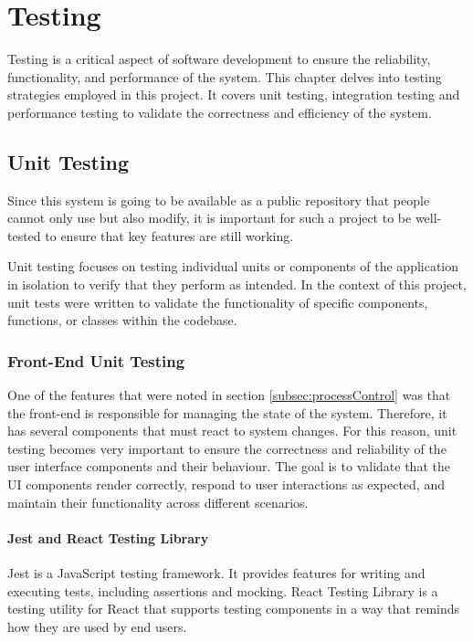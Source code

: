 \chapter{Testing}
\label{ch:7}

Testing is a critical aspect of software development to ensure the reliability, functionality, and performance of the system. This chapter delves into testing strategies employed in this project. It covers unit testing, integration testing and performance testing to validate the correctness and efficiency of the system.

\section{Unit Testing}

Since this system is going to be available as a public repository that people cannot only use but also modify, it is important for such a project to be well-tested to ensure that key features are still working.

Unit testing focuses on testing individual units or components of the application in isolation to verify that they perform as intended. In the context of this project, unit tests were written to validate the functionality of specific components, functions, or classes within the codebase.

\subsection{Front-End Unit Testing}

One of the features that were noted in section \ref{subsec:processControl} was that the front-end is responsible for managing the state of the system. Therefore, it has several components that must react to system changes. For this reason, unit testing becomes very important to ensure the correctness and reliability of the user interface components and their behaviour. The goal is to validate that the UI components render correctly, respond to user interactions as expected, and maintain their functionality across different scenarios.

\subsubsection{Jest and React Testing Library}

Jest is a JavaScript testing framework. It provides features for writing and executing tests, including assertions and mocking. React Testing Library is a testing utility for React that supports testing components in a way that reminds how they are used by end users.


